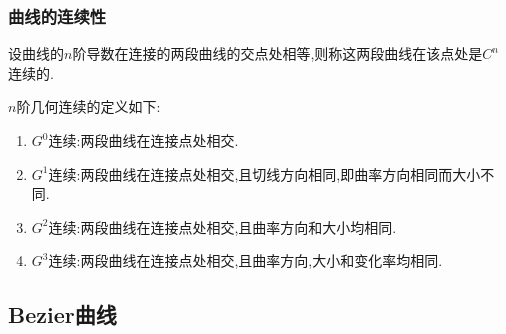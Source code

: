 \documentclass{ctexart}
\begin{document}
\subsubsection{曲线的连续性}
\begin{definition}[参数连续性]
    设曲线的$n$阶导数在连接的两段曲线的交点处相等,则称这两段曲线在该点处是$C^n$连续的.
\end{definition}
\begin{definition}[几何连续性]
    $n$阶几何连续的定义如下:
    \begin{enumerate}[label=\arabic*.,topsep=0pt,parsep=0pt,itemsep=0pt,partopsep=0pt]
        \item $G^0$连续:两段曲线在连接点处相交.
        \item $G^1$连续:两段曲线在连接点处相交,且切线方向相同,即曲率方向相同而大小不同.
        \item $G^2$连续:两段曲线在连接点处相交,且曲率方向和大小均相同.
        \item $G^3$连续:两段曲线在连接点处相交,且曲率方向,大小和变化率均相同.
    \end{enumerate}
\end{definition}
\subsection{Bezier曲线}
\end{document}
